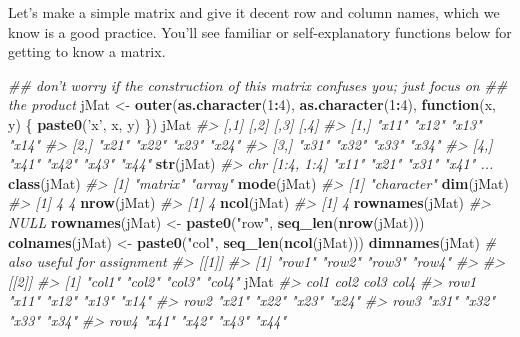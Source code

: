 \documentclass[
]{book}
\newenvironment{Shaded}{\begin{snugshade}}{\end{snugshade}}
\newcommand{\CommentTok}[1]{\textcolor[rgb]{0.56,0.35,0.01}{\textit{#1}}}
\newcommand{\ControlFlowTok}[1]{\textcolor[rgb]{0.13,0.29,0.53}{\textbf{#1}}}
\newcommand{\DecValTok}[1]{\textcolor[rgb]{0.00,0.00,0.81}{#1}}
\newcommand{\KeywordTok}[1]{\textcolor[rgb]{0.13,0.29,0.53}{\textbf{#1}}}
\newcommand{\NormalTok}[1]{#1}
\newcommand{\OperatorTok}[1]{\textcolor[rgb]{0.81,0.36,0.00}{\textbf{#1}}}
\newcommand{\StringTok}[1]{\textcolor[rgb]{0.31,0.60,0.02}{#1}}
\begin{document}
Let's make a simple matrix and give it decent row and column names, which we know is a good practice. You'll see familiar or self-explanatory functions below for getting to know a matrix.

\begin{Shaded}
\begin{Highlighting}[]
\CommentTok{## don't worry if the construction of this matrix confuses you; just focus on}
\CommentTok{## the product}
\NormalTok{jMat <-}\StringTok{ }\KeywordTok{outer}\NormalTok{(}\KeywordTok{as.character}\NormalTok{(}\DecValTok{1}\OperatorTok{:}\DecValTok{4}\NormalTok{), }\KeywordTok{as.character}\NormalTok{(}\DecValTok{1}\OperatorTok{:}\DecValTok{4}\NormalTok{),}
              \ControlFlowTok{function}\NormalTok{(x, y) \{}
                \KeywordTok{paste0}\NormalTok{(}\StringTok{'x'}\NormalTok{, x, y)}
\NormalTok{                \})}
\NormalTok{jMat}
\CommentTok{#>      [,1]  [,2]  [,3]  [,4] }
\CommentTok{#> [1,] "x11" "x12" "x13" "x14"}
\CommentTok{#> [2,] "x21" "x22" "x23" "x24"}
\CommentTok{#> [3,] "x31" "x32" "x33" "x34"}
\CommentTok{#> [4,] "x41" "x42" "x43" "x44"}
\KeywordTok{str}\NormalTok{(jMat)}
\CommentTok{#>  chr [1:4, 1:4] "x11" "x21" "x31" "x41" ...}
\KeywordTok{class}\NormalTok{(jMat)}
\CommentTok{#> [1] "matrix" "array"}
\KeywordTok{mode}\NormalTok{(jMat)}
\CommentTok{#> [1] "character"}
\KeywordTok{dim}\NormalTok{(jMat)}
\CommentTok{#> [1] 4 4}
\KeywordTok{nrow}\NormalTok{(jMat)}
\CommentTok{#> [1] 4}
\KeywordTok{ncol}\NormalTok{(jMat)}
\CommentTok{#> [1] 4}
\KeywordTok{rownames}\NormalTok{(jMat)}
\CommentTok{#> NULL}
\KeywordTok{rownames}\NormalTok{(jMat) <-}\StringTok{ }\KeywordTok{paste0}\NormalTok{(}\StringTok{"row"}\NormalTok{, }\KeywordTok{seq_len}\NormalTok{(}\KeywordTok{nrow}\NormalTok{(jMat)))}
\KeywordTok{colnames}\NormalTok{(jMat) <-}\StringTok{ }\KeywordTok{paste0}\NormalTok{(}\StringTok{"col"}\NormalTok{, }\KeywordTok{seq_len}\NormalTok{(}\KeywordTok{ncol}\NormalTok{(jMat)))}
\KeywordTok{dimnames}\NormalTok{(jMat) }\CommentTok{# also useful for assignment}
\CommentTok{#> [[1]]}
\CommentTok{#> [1] "row1" "row2" "row3" "row4"}
\CommentTok{#> }
\CommentTok{#> [[2]]}
\CommentTok{#> [1] "col1" "col2" "col3" "col4"}
\NormalTok{jMat}
\CommentTok{#>      col1  col2  col3  col4 }
\CommentTok{#> row1 "x11" "x12" "x13" "x14"}
\CommentTok{#> row2 "x21" "x22" "x23" "x24"}
\CommentTok{#> row3 "x31" "x32" "x33" "x34"}
\CommentTok{#> row4 "x41" "x42" "x43" "x44"}
\end{Highlighting}
\end{Shaded}
\end{document}
